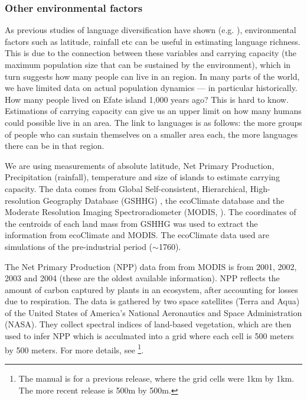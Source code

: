 \documentclass[a4paper,10pt]{article} %
\begin{document}
\subsubsection{Other environmental factors} 
As previous studies of language diversification have shown (e.g. \citet{ greenhill2015demographic, gavin2017process, Pacheco_Coelho_2019, hua2019ecological}), environmental factors such as latitude, rainfall etc can be useful in estimating language richness. This is due to the connection between these variables and carrying capacity (the maximum population size that can be sustained by the environment), which in turn suggests how many people can live in an region. In many parts of the world, we have limited data on actual population dynamics --- in particular historically. How many people lived on Efate island 1,000 years ago? This is hard to know. Estimations of carrying capacity can give us an upper limit on how many humans could possible live in an area. The link to languages is as follows: the more groups of people who can sustain themselves on a smaller area each, the more languages there can be in that region.

We are using measurements of absolute latitude, Net Primary Production, Precipitation (rainfall), temperature and size of islands to estimate carrying capacity. The data comes from Global Self-consistent, Hierarchical, High-resolution Geography Database (GSHHG) \citep{wessel1996global}, the ecoClimate database \citep{ecoclimate} and the Moderate Resolution Imaging Spectroradiometer (MODIS, \citet{running2021modis_terra, running2021modis_aqua}). The coordinates of the centroids of each land mass from GSHHG was used to extract the information from ecoClimate and MODIS. The ecoClimate data used are simulations of the pre-industrial period ($\sim$1760).

The Net Primary Production (NPP) data from from MODIS is from 2001, 2002, 2003 and 2004 (these are the oldest available information). NPP reflects the amount of carbon captured by plants in an ecosystem, after accounting for losses due to respiration. The data is gathered by two space satellites (Terra and Aqua) of the United States of America's National Aeronautics and Space Administration (NASA). They collect spectral indices of land-based vegetation, which are then used to infer NPP which is acculmated into a grid where each cell is 500 meters by 500 meters. For more details, see \citet{running2015daily} \footnote{The manual is for a previous release, where the grid cells were 1km by 1km. The more recent release is 500m by 500m.}.
\end{document}
